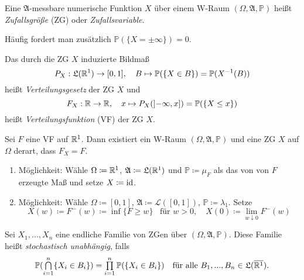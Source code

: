 \documentclass{cheat-sheet}
\newcommand{\Alg}{\mathfrak{A}} %
\newcommand{\LebAlg}{\mathfrak{L}} %
\renewcommand{\P}{\mathbb{P}} %
\newcommand{\Leb}{\mathcal{L}} %
\renewcommand{\ER}{\overline{\R^1}} %
\begin{document}
\begin{defn}
  Eine $\Alg$-messbare numerische Funktion $X$ über einem W-Raum $(\Omega, \Alg, \P)$ heißt \emph{Zufallsgröße} (ZG) oder \emph{Zufallsvariable}.
\end{defn}


\begin{bem}
  Häufig fordert man zusätzlich $\P(\{ X = \pm \infty \}) = 0$.
\end{bem}

\begin{defn}
  Das durch die ZG $X$ induzierte Bildmaß
  \[ P_X : \LebAlg(\R^1) \to [0,1], \quad B \mapsto \P(\{ X \in B \}) = \P(X^{-1}(B)) \]
  heißt \emph{Verteilungsgesetz} der ZG $X$ und
  \[ F_X : \R \to \R, \quad x \mapsto P_X(\left]-\infty, x\right]) = \P(\{ X \leq x \}) \]
  heißt \emph{Verteilungsfunktion} (VF) der ZG $X$.
\end{defn}


\begin{satz}
  Sei $F$ eine VF auf $\mathbb{R}^1$. Dann existiert ein W-Raum $(\Omega, \Alg, \P)$ und eine ZG $X$ auf $\Omega$ derart, dass $F_X = F$.
\end{satz}

\begin{beweis}
  \begin{enumerate}
    \item Möglichkeit: Wähle $\Omega \coloneqq \mathbb{R}^1$, $\Alg \coloneqq \LebAlg(\R^1)$ und $\P \coloneqq \mu_F$ als das von von $F$ erzeugte Maß und setze $X \coloneqq \mathrm{id}$.
    \item Möglichkeit: Wähle $\Omega \coloneqq [0,1]$, $\Alg \coloneqq \Leb([0,1])$, $\P \coloneqq \lambda_1$. Setze
    \[
      X(w) \coloneqq F^{-}(w) \coloneqq \inf \{ F \geq w \} \enspace \text{ für } w > 0, \quad
      X(0) \coloneqq \lim_{w \downarrow 0} F^{-}(w)
    \]
  \end{enumerate}
\end{beweis}




\begin{defn}
  Sei $X_1, ..., X_n$ eine endliche Familie von ZGen über $(\Omega, \Alg, \P)$. Diese Familie heißt \emph{stochastisch unabhängig}, falls
  \[ \P(\bigcap_{i=1}^n \{ X_i \in B_i \}) = \prod_{i=1}^n \P(\{ X_i \in B_i \}) \quad \text{für alle $B_1, ..., B_n \in \LebAlg(\ER)$.} \]
\end{defn}
\end{document}
